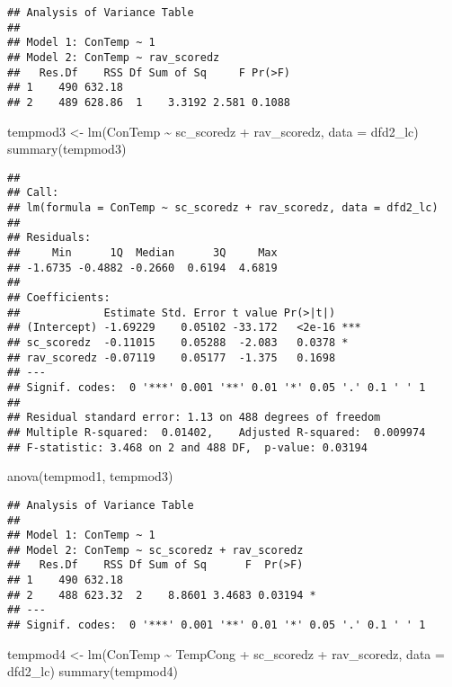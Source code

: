 \documentclass[
]{article}
\newenvironment{Shaded}{\begin{snugshade}}{\end{snugshade}}
\newcommand{\AttributeTok}[1]{\textcolor[rgb]{0.77,0.63,0.00}{#1}}
\newcommand{\FunctionTok}[1]{\textcolor[rgb]{0.00,0.00,0.00}{#1}}
\newcommand{\NormalTok}[1]{#1}
\newcommand{\OtherTok}[1]{\textcolor[rgb]{0.56,0.35,0.01}{#1}}
\newcommand{\SpecialCharTok}[1]{\textcolor[rgb]{0.00,0.00,0.00}{#1}}
\begin{document}
\begin{verbatim}
## Analysis of Variance Table
## 
## Model 1: ConTemp ~ 1
## Model 2: ConTemp ~ rav_scoredz
##   Res.Df    RSS Df Sum of Sq     F Pr(>F)
## 1    490 632.18                          
## 2    489 628.86  1    3.3192 2.581 0.1088
\end{verbatim}

\begin{Shaded}
\begin{Highlighting}[]
\NormalTok{tempmod3 }\OtherTok{\textless{}{-}} \FunctionTok{lm}\NormalTok{(ConTemp }\SpecialCharTok{\textasciitilde{}}\NormalTok{ sc\_scoredz }\SpecialCharTok{+}\NormalTok{ rav\_scoredz, }\AttributeTok{data =}\NormalTok{ dfd2\_lc)}
\FunctionTok{summary}\NormalTok{(tempmod3)}
\end{Highlighting}
\end{Shaded}

\begin{verbatim}
## 
## Call:
## lm(formula = ConTemp ~ sc_scoredz + rav_scoredz, data = dfd2_lc)
## 
## Residuals:
##     Min      1Q  Median      3Q     Max 
## -1.6735 -0.4882 -0.2660  0.6194  4.6819 
## 
## Coefficients:
##             Estimate Std. Error t value Pr(>|t|)    
## (Intercept) -1.69229    0.05102 -33.172   <2e-16 ***
## sc_scoredz  -0.11015    0.05288  -2.083   0.0378 *  
## rav_scoredz -0.07119    0.05177  -1.375   0.1698    
## ---
## Signif. codes:  0 '***' 0.001 '**' 0.01 '*' 0.05 '.' 0.1 ' ' 1
## 
## Residual standard error: 1.13 on 488 degrees of freedom
## Multiple R-squared:  0.01402,    Adjusted R-squared:  0.009974 
## F-statistic: 3.468 on 2 and 488 DF,  p-value: 0.03194
\end{verbatim}

\begin{Shaded}
\begin{Highlighting}[]
\FunctionTok{anova}\NormalTok{(tempmod1, tempmod3)}
\end{Highlighting}
\end{Shaded}

\begin{verbatim}
## Analysis of Variance Table
## 
## Model 1: ConTemp ~ 1
## Model 2: ConTemp ~ sc_scoredz + rav_scoredz
##   Res.Df    RSS Df Sum of Sq      F  Pr(>F)  
## 1    490 632.18                              
## 2    488 623.32  2    8.8601 3.4683 0.03194 *
## ---
## Signif. codes:  0 '***' 0.001 '**' 0.01 '*' 0.05 '.' 0.1 ' ' 1
\end{verbatim}

\begin{Shaded}
\begin{Highlighting}[]
\NormalTok{tempmod4 }\OtherTok{\textless{}{-}} \FunctionTok{lm}\NormalTok{(ConTemp }\SpecialCharTok{\textasciitilde{}}\NormalTok{ TempCong }\SpecialCharTok{+}\NormalTok{ sc\_scoredz }\SpecialCharTok{+}\NormalTok{ rav\_scoredz, }\AttributeTok{data =}\NormalTok{ dfd2\_lc)}
\FunctionTok{summary}\NormalTok{(tempmod4)}
\end{Highlighting}
\end{Shaded}
\end{document}
